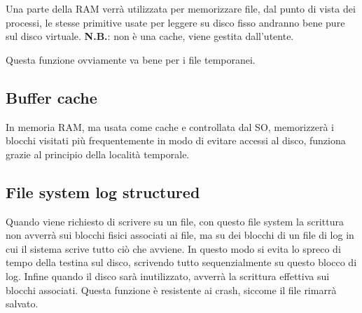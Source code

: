 \documentclass[a4paper, 12pt]{book}
\begin{document}
Una parte della RAM verrà utilizzata per memorizzare file,
dal punto di vista dei processi, le stesse primitive usate 
per leggere su disco fisso andranno bene pure sul disco
virtuale. \textbf{N.B.}: non è una cache, viene gestita 
dall'utente.

Questa funzione ovviamente va bene per i file temporanei.

\subsection{Buffer cache}

In memoria RAM, ma usata come cache e controllata dal 
SO, memorizzerà i blocchi visitati più frequentemente 
in modo di evitare accessi al disco, funziona grazie al 
principio della località temporale.

\subsection{File system log structured}

Quando viene richiesto di scrivere su un file, con questo 
file system la scrittura non avverrà sui blocchi 
fisici associati ai file, ma su dei blocchi di un file di 
log in cui il sistema scrive tutto ciò che avviene. 
In questo modo si evita lo spreco di tempo della testina 
sul disco, scrivendo tutto sequenzialmente su questo blocco 
di log. Infine quando il disco sarà inutilizzato, avverrà 
la scrittura effettiva sui blocchi associati. Questa 
funzione è resistente ai crash, siccome il file rimarrà
salvato.  





    
    
\end{document}
